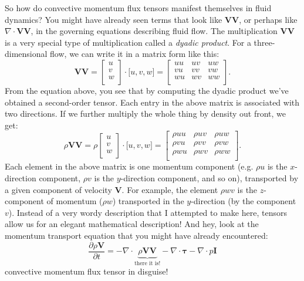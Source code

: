 \documentclass[10pt,twocolumn]{article}
\begin{document}
So how do convective momentum flux tensors manifest themselves in fluid dynamics? You might have already seen terms that look like $\pmb{V} \pmb{V}$, or perhaps like $\nabla \cdot \pmb{V} \pmb{V}$, in the governing equations describing fluid flow. The multiplication $\pmb{V} \pmb{V}$ is a very special type of multiplication called a \textit{dyadic product}. For a three-dimensional flow, we can write it in a matrix form like this:
\begin{equation*}
  \mathbf{V} \mathbf{V} =
  \begin{bmatrix}
  u \\
  v \\
  w \\
  \end{bmatrix}
  \cdot 
  \Big[ u , v , w \Big] = 
  \begin{bmatrix}
  uu & uv & uw\\
  vu & vv & vw \\
  wu & wv & ww \\
  \end{bmatrix}.
\end{equation*}
From the equation above, you see that by computing the dyadic product we've obtained a second-order tensor. Each entry in the above matrix is associated with two directions. If we further multiply the whole thing by density out front, we get:
\begin{equation*}
 \rho \mathbf{V} \mathbf{V} =
  \rho
  \begin{bmatrix}
  u \\
  v \\
  w \\
  \end{bmatrix}
  \cdot 
  \Big[ u , v , w \Big] = 
  \begin{bmatrix}
   \rho uu &  \rho uv &  \rho uw\\
   \rho vu &  \rho vv &  \rho vw \\
   \rho wu &  \rho wv &  \rho ww \\
  \end{bmatrix}.
\end{equation*}
Each element in the above matrix is one momentum component (e.g. $\rho u$ is the $x$-direction component, $\rho v$ is the $y$-direction component, and so on), transported by a given component of velocity $\pmb{V}$. For example, the element $\rho w v$ is the $z$-component of momentum ($\rho w$) transported in the $y$-direction (by the component $v$). Instead of a very wordy description that I attempted to make here, tensors allow us for an elegant mathematical description!
And hey, look at the momentum transport equation that you might have already encountered:
\begin{equation*}
\frac{\partial \rho \mathbf{V}}{\partial t} = - \nabla \cdot \underbrace{\rho \mathbf{V} \mathbf{V}}_\text{there it is!} - \nabla \cdot \pmb{\tau} - \nabla \cdot p \mathbf{I}
\end{equation*}
convective momentum flux tensor in disguise!
\end{document}
